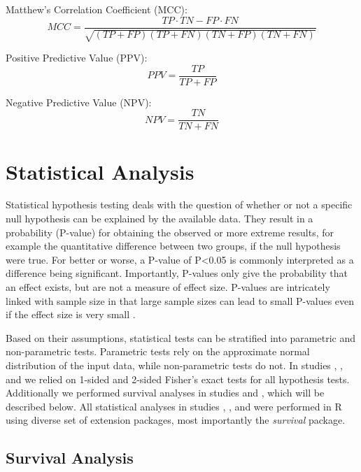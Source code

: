 \documentclass[11pt]{book}
\begin{document}
Matthew's Correlation Coefficient (MCC):
\begin{equation} \label{eq:mcc}
MCC = \frac{TP \cdot TN - FP \cdot FN}{\sqrt{(TP + FP)(TP + FN)(TN + FP)(TN + FN)}}
\end{equation}

Positive Predictive Value (PPV):
\begin{equation} \label{eq:ppv}
PPV = \frac{TP}{TP + FP}
\end{equation}

Negative Predictive Value (NPV):
\begin{equation} \label{eq:npv}
NPV = \frac{TN}{TN + FN}
\end{equation}



\section{Statistical Analysis}
\label{sec:statistical-analysis}

Statistical hypothesis testing deals with the question of whether or not a specific null hypothesis can be explained by the available data. They result in a probability (P-value) for obtaining the observed or more extreme results, for example the quantitative difference between two groups, if the null hypothesis were true. For better or worse, a P-value of P<0.05 is commonly interpreted as a difference being significant. Importantly, P-values only give the probability that an effect exists, but are not a measure of effect size. P-values are intricately linked with sample size in that large sample sizes can lead to small P-values even if the effect size is very small \cite{Lantz:2013}.

Based on their assumptions, statistical tests can be stratified into parametric and non-parametric tests. Parametric tests rely on the approximate normal distribution of the input data, while non-parametric tests do not. In studies \I, \III, and \IV we relied on 1-sided and 2-sided Fisher's exact tests for all hypothesis tests. Additionally we performed survival analyses in studies \III and \IV, which will be described below. All statistical analyses in studies \I, \III, and \IV were performed in R using diverse set of extension packages, most importantly the \textit{survival} package.

\subsection{Survival Analysis}
\label{subsec:survival-analysis}
\end{document}
